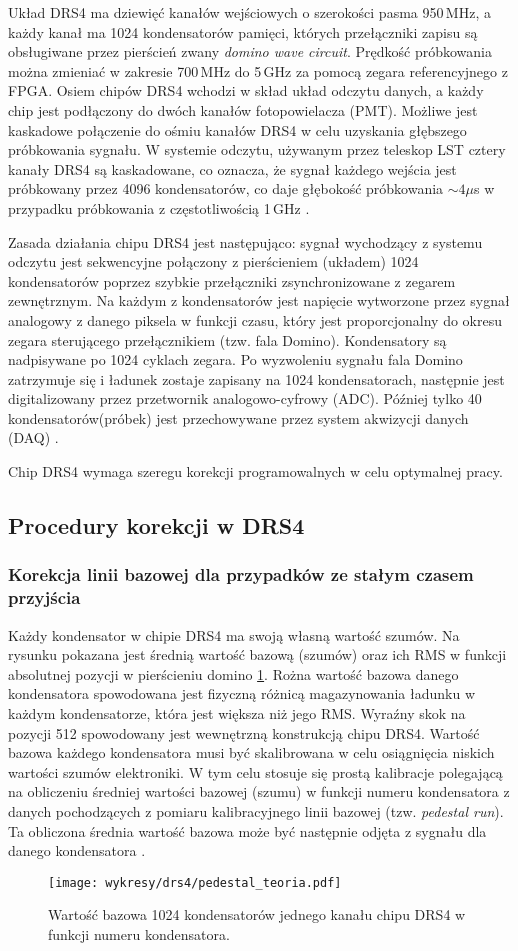 \documentclass[a4paper,11pt,twoside]{article}
\begin{document}
Układ DRS4 ma dziewięć kanałów wejściowych o szerokości pasma 950\,MHz, a każdy kanał ma 1024 kondensatorów pamięci, których przełączniki zapisu są obsługiwane przez pierścień zwany \textsl{domino wave circuit}. Prędkość próbkowania można zmieniać w zakresie 700\,MHz do 5\,GHz za pomocą zegara referencyjnego z FPGA. Osiem chipów DRS4 wchodzi w skład układ odczytu danych, a każdy chip jest podłączony do dwóch kanałów fotopowielacza (PMT). Możliwe jest kaskadowe połączenie do ośmiu kanałów DRS4 w celu uzyskania głębszego próbkowania sygnału. W systemie odczytu, używanym przez teleskop LST cztery kanały DRS4 są kaskadowane, co oznacza, że sygnał każdego wejścia jest próbkowany przez 4096 kondensatorów, co daje głębokość próbkowania $\sim 4 \mathtt{\mu}$s w przypadku próbkowania z częstotliwością 1\,GHz \cite{dragon_lst}.

Zasada działania chipu DRS4 jest następująco: sygnał wychodzący z systemu odczytu jest sekwencyjne połączony z pierścieniem (układem) 1024 kondensatorów poprzez szybkie przełączniki zsynchronizowane z zegarem zewnętrznym. Na każdym z kondensatorów jest napięcie wytworzone przez sygnał analogowy z danego piksela w funkcji czasu, który jest proporcjonalny do okresu zegara sterującego przełącznikiem (tzw. fala Domino). Kondensatory są nadpisywane po 1024 cyklach zegara. Po wyzwoleniu sygnału fala Domino zatrzymuje się i ładunek zostaje zapisany na 1024 kondensatorach, następnie jest digitalizowany przez przetwornik analogowo-cyfrowy (ADC). Później tylko 40 
kondensatorów(próbek) jest przechowywane przez system akwizycji danych (DAQ) \cite{drs4_psi}. 

Chip DRS4 wymaga szeregu korekcji programowalnych w celu optymalnej pracy.
\subsection{Procedury korekcji w DRS4}
\subsubsection{Korekcja linii bazowej dla przypadków ze stałym czasem przyjścia}
Każdy kondensator w chipie DRS4 ma swoją własną wartość szumów. Na rysunku pokazana jest średnią wartość bazową (szumów) oraz ich RMS w funkcji absolutnej pozycji w pierścieniu domino \ref{fig:baseline_cap}. Rożna wartość bazowa danego kondensatora spowodowana jest fizyczną różnicą magazynowania ładunku w każdym kondensatorze, która jest większa niż jego RMS. Wyraźny skok na pozycji 512 spowodowany jest wewnętrzną konstrukcją chipu DRS4. Wartość bazowa każdego kondensatora musi być skalibrowana w celu osiągnięcia niskich wartości szumów elektroniki. W tym celu stosuje się prostą kalibracje polegającą na obliczeniu średniej wartości bazowej (szumu) w funkcji numeru kondensatora z danych pochodzących z pomiaru kalibracyjnego linii bazowej (tzw. \textsl{pedestal run}). Ta obliczona średnia wartość bazowa może być następnie odjęta z sygnału dla danego kondensatora \cite{drs4_magic}. 
\begin{figure}[H] 
\centering
\texttt{[image: wykresy/drs4/pedestal\_teoria.pdf]}
\caption{Wartość bazowa 1024 kondensatorów jednego kanału chipu DRS4 w funkcji numeru kondensatora.}
\label{fig:baseline_cap}
\end{figure}
\end{document}
